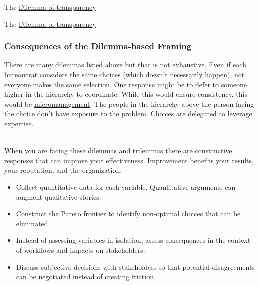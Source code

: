 The \href{table:dilemma-transparency}{Dilemma of transparency}

The \href{table:dilemma-transparency}{Dilemma of transparency}



\subsubsection{Consequences of the Dilemma-based Framing}

There are many dilemmas listed above but that is not exhaustive. Even if each bureaucrat considers the same choices (which doesn't necessarily happen), not everyone makes the same selection. One response might be to defer to someone higher in the hierarchy to coordinate. While this would ensure consistency, this would be \href{https://en.wikipedia.org/wiki/Micromanagement}{micromanagement}. The people in the hierarchy above the person facing the choice don't have exposure to the problem. Choices are delegated to leverage expertise. 

\ \\

When you are facing these dilemmas and trilemmas
there are constructive responses that can improve your effectiveness. Improvement benefits your results, your reputation, and the organization. 
\begin{itemize}
    \item Collect quantitative data for each variable. Quantitative arguments can augment qualitative stories. 
    \item Construct the Pareto frontier to identify non-optimal choices that can be eliminated.
    \item Instead of assessing variables in isolation, assess consequences in the context of workflows and impacts on stakeholders.
    \item Discuss subjective decisions with stakeholders so that potential disagreements can be negotiated instead of creating friction.
\end{itemize}
 

